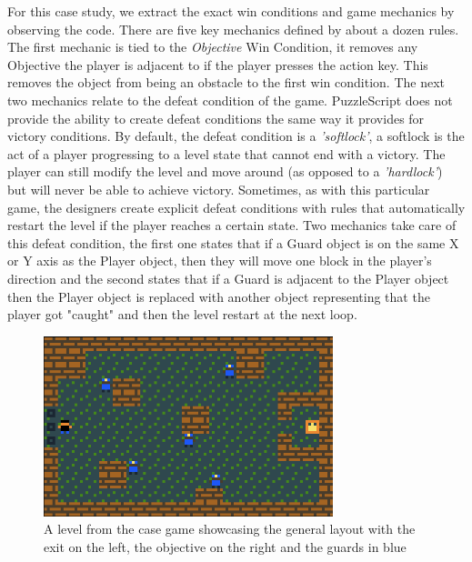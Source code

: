 For this case study, we extract the exact win conditions and game mechanics by observing the code. There are five key mechanics defined by about a dozen rules. The first mechanic is tied to the \textit{Objective} Win Condition, it removes any Objective the player is adjacent to if the player presses the action key. This removes the object from being an obstacle to the first win condition. The next two mechanics relate to the defeat condition of the game. PuzzleScript does not provide the ability to create defeat conditions the same way it provides for victory conditions. By default, the defeat condition is a \emph{'softlock'}, a softlock is the act of a player progressing to a level state that cannot end with a victory. The player can still modify the level and move around (as opposed to a \emph{'hardlock'}) but will never be able to achieve victory. Sometimes, as with this particular game, the designers create explicit defeat conditions with rules that automatically restart the level if the player reaches a certain state. Two mechanics take care of this defeat condition, the first one states that if a Guard object is on the same X or Y axis as the Player object, then they will move one block in the player's direction and the second states that if a Guard is adjacent to the Player object then the Player object is replaced with another object representing that the player got "caught" and then the level restart at the next loop.

\begin{figure}[!t]
    \centering
    \includegraphics[width=0.75\textwidth]{images/case_results/Case_game.png}
    \caption{A level from the case game showcasing the general layout with the exit on the left, the objective on the right and the guards in blue}
    \label{fig:case_game_example}
\end{figure}

